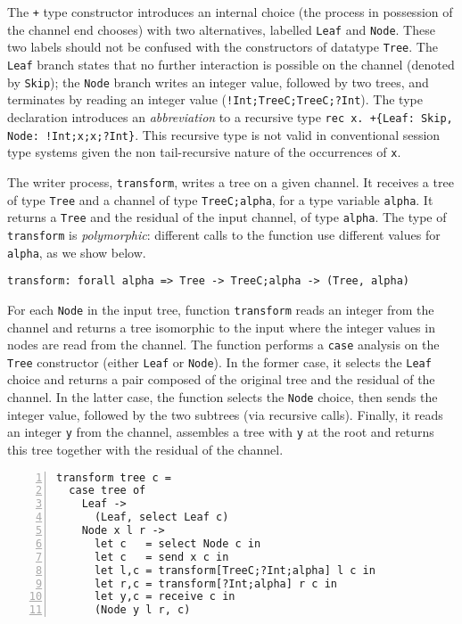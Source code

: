 The \lstinline|+| type constructor introduces an internal choice (the
process in possession of the channel end chooses) with two
alternatives, labelled \lstinline|Leaf| and \lstinline|Node|. These
two labels should not be confused with the constructors of datatype
\lstinline|Tree|. The \lstinline|Leaf| branch states that no further
interaction is possible on the channel (denoted by \lstinline|Skip|);
the \lstinline|Node| branch writes an integer value, followed by two
trees, and terminates by reading an integer value
(\lstinline|!Int;TreeC;TreeC;?Int|).
%
The type declaration introduces an \emph{abbreviation} to a recursive
type \lstinline|rec x. +{Leaf: Skip, Node: !Int;x;x;?Int}|.
%
This recursive type is not valid in conventional session type systems
given the non tail-recursive nature of the occurrences of
\lstinline|x|.


The writer process, \lstinline|transform|, writes a tree on a given
channel. It receives a tree of type \lstinline|Tree|  and a channel
of type \lstinline|TreeC;alpha|, for a type variable
\lstinline|alpha|. It returns a \lstinline|Tree| and the residual of
the input channel, of type \lstinline|alpha|. The type of
\lstinline|transform| is \emph{polymorphic}: different calls to the
function use different values for \lstinline|alpha|, as we show below.

\begin{lstlisting}
transform: forall alpha => Tree -> TreeC;alpha -> (Tree, alpha)
\end{lstlisting}

For each \lstinline|Node| in the input tree, function
\lstinline|transform| reads an integer from the channel and returns a
tree isomorphic to the input where the integer values in nodes are
read from the channel.
%
The function performs a \lstinline|case| analysis on the
\lstinline|Tree| constructor (either \lstinline|Leaf| or
\lstinline|Node|). In the former case, it selects the \lstinline|Leaf|
choice and returns a pair composed of the original tree and the
residual of the channel. In the latter case, the function selects the
\lstinline|Node| choice, then sends the integer value, followed by the
two subtrees (via recursive calls). Finally, it reads an integer
\lstinline|y| from the channel, assembles a tree with \lstinline|y| at
the root and returns this tree together with the residual of the
channel.
%
\begin{lstlisting}[numbers=left]
transform tree c =
  case tree of
    Leaf ->
      (Leaf, select Leaf c)
    Node x l r ->
      let c   = select Node c in
      let c   = send x c in
      let l,c = transform[TreeC;?Int;alpha] l c in
      let r,c = transform[?Int;alpha] r c in
      let y,c = receive c in
      (Node y l r, c)
\end{lstlisting}

